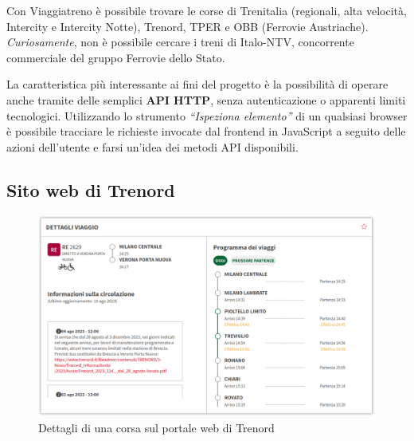 \documentclass[12pt,a4paper,italian]{report}
\begin{document}
Con Viaggiatreno è possibile trovare le corse di Trenitalia
(regionali, alta velocità, Intercity e Intercity Notte), Trenord, TPER
e OBB (Ferrovie Austriache).  \textit{Curiosamente}, non è possibile
cercare i treni di Italo-NTV, concorrente commerciale del gruppo
Ferrovie dello Stato.

La caratteristica più interessante ai fini del progetto è la
possibilità di operare anche tramite delle semplici \textbf{API HTTP},
senza autenticazione o apparenti limiti tecnologici.  Utilizzando lo
strumento \textit{``Ispeziona elemento''} di un qualsiasi browser è
possibile tracciare le richieste invocate dal frontend in JavaScript a
seguito delle azioni dell'utente e farsi un'idea dei metodi API
disponibili.



\subsection{Sito web di Trenord}

\begin{figure}[h] \centering
    \includegraphics[width=1\textwidth]{images/trenord_api.png}
	\caption{Dettagli di una corsa sul portale web di Trenord}
\end{figure}
\end{document}
